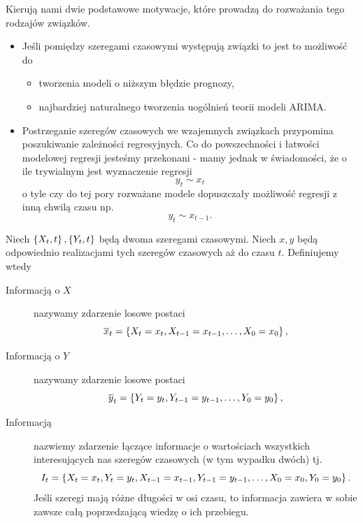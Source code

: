 \documentclass[10pt,a4paper]{book}
\begin{document}
Kierują nami dwie podstawowe motywacje, które prowadzą do rozważania tego rodzajów związków. 
\begin{itemize}
\item Jeśli pomiędzy szeregami czasowymi występują związki to jest to możliwość do 
\begin{itemize}
\item tworzenia modeli o niższym błędzie prognozy,
\item najbardziej naturalnego tworzenia uogólnień teorii modeli ARIMA.
\end{itemize}
\item Postrzeganie szeregów czasowych we wzajemnych związkach przypomina poszukiwanie zależności regresyjnych. Co do powszechności i łatwości modelowej regresji jesteśmy przekonani - mamy jednak w świadomości, że o ile trywialnym jest wyznaczenie regresji
$$
y_t \sim x_t
$$
o tyle czy do tej pory rozważane modele dopuszczały możliwość regresji z inną chwilą czasu np.
$$
y_t \sim x_{t-1}.
$$
\end{itemize}

\begin{definition}[Informacja]
Niech $\left\lbrace {{X_t}, {t}} \right\rbrace, \left\lbrace {{Y_t}, {t}} \right\rbrace$ będą dwoma szeregami czasowymi. Niech $x,y$ będą odpowiednio realizacjami tych szeregów czasowych aż do czasu $t$. Definiujemy wtedy 
\begin{description}
\item[Informacją o $X$] nazywamy zdarzenie losowe postaci
$$
\overline{x}_t = \left\lbrace { X_t = x_t , X_{t-1} = x_{t-1} , \ldots , X_0 = x_0} \right\rbrace, 
$$
\item[Informacją o $Y$] nazywamy zdarzenie losowe postaci
$$
\overline{y}_t = \left\lbrace { Y_t = y_t , Y_{t-1} = y_{t-1} , \ldots , Y_0 = y_0} \right\rbrace, 
$$
\item[Informacją ] nazwiemy zdarzenie łączące informacje o wartościach wszystkich interesujących nas szeregów czasowych (w tym wypadku dwóch) tj.
$$
I_t = \left\lbrace { X_t = x_t, Y_t = y_t , X_{t-1} = x_{t-1}, Y_{t-1} = y_{t-1}, \ldots , X_0 = x_0, Y_0 = y_0} \right\rbrace. 
$$
Jeśli szeregi mają różne długości w osi czasu, to informacja zawiera w sobie zawsze całą poprzedzającą wiedzę o ich przebiegu.
\end{description}
\end{definition}
\end{document}
